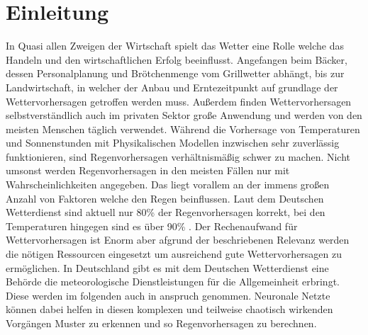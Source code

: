 \section{Einleitung}
In Quasi allen Zweigen der Wirtschaft spielt das Wetter eine Rolle welche das Handeln und den wirtschaftlichen Erfolg beeinflusst.
Angefangen beim Bäcker, dessen Personalplanung und Brötchenmenge vom Grillwetter abhängt, 
bis zur Landwirtschaft, in welcher der Anbau und Erntezeitpunkt auf grundlage der Wettervorhersagen getroffen werden muss. 
Außerdem finden Wettervorhersagen selbstverständlich auch im privaten Sektor große Anwendung und werden von den meisten Menschen täglich verwendet. 
Während die Vorhersage von Temperaturen und Sonnenstunden mit Physikalischen Modellen inzwischen sehr zuverlässig funktionieren, 
sind Regenvorhersagen verhältnismäßig schwer zu machen. Nicht umsonst werden Regenvorhersagen in den meisten Fällen nur mit Wahrscheinlichkeiten angegeben. 
Das liegt vorallem an der immens großen Anzahl von Faktoren welche den Regen beinflussen. 
Laut dem Deutschen Wetterdienst sind aktuell nur 80\% der Regenvorhersagen korrekt, bei den Temperaturen hingegen sind es über 90\% \cite{SpiegelWetter}. 
Der Rechenaufwand für Wettervorhersagen ist Enorm aber afgrund der beschriebenen Relevanz werden die nötigen Ressourcen eingesetzt um ausreichend gute Wettervorhersagen zu ermöglichen.
In Deutschland gibt es mit dem Deutschen Wetterdienst eine Behörde die meteorologische Dienstleistungen für die Allgemeinheit erbringt.
Diese werden im folgenden auch in anspruch genommen.      
\noindent Neuronale Netzte können dabei helfen in diesen komplexen und teilweise chaotisch wirkenden Vorgängen Muster zu erkennen und so Regenvorhersagen zu berechnen. 
